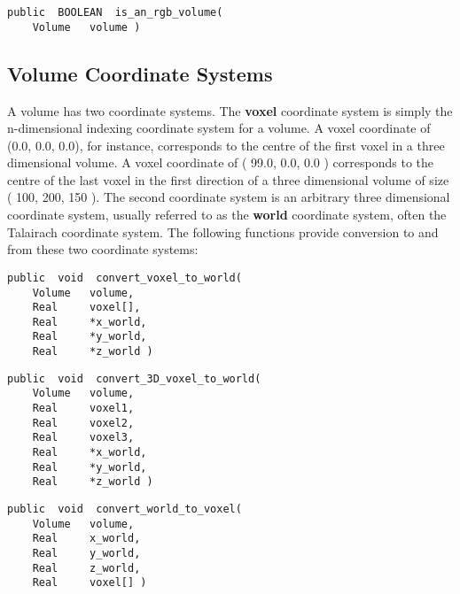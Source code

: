 
{\bf\begin{verbatim}
public  BOOLEAN  is_an_rgb_volume(
    Volume   volume )
\end{verbatim}}


\subsection{Volume Coordinate Systems}

A volume has two coordinate systems.  The {\bf voxel} coordinate
system is simply the n-dimensional indexing coordinate system for a
volume.  A voxel coordinate of (0.0, 0.0, 0.0), for instance, corresponds
to the centre of the first voxel in a three dimensional volume.  A voxel
coordinate of ( 99.0, 0.0, 0.0 ) corresponds to the centre of the last
voxel in the first direction of a three dimensional volume of size (
100, 200, 150 ).  The second coordinate system is an arbitrary
three dimensional coordinate system, usually referred to as the
{\bf world} coordinate system, often
the Talairach coordinate system.  The following functions provide
conversion to and from these two coordinate systems:

{\bf\begin{verbatim}
public  void  convert_voxel_to_world(
    Volume   volume,
    Real     voxel[],
    Real     *x_world,
    Real     *y_world,
    Real     *z_world )
\end{verbatim}}


{\bf\begin{verbatim}
public  void  convert_3D_voxel_to_world(
    Volume   volume,
    Real     voxel1,
    Real     voxel2,
    Real     voxel3,
    Real     *x_world,
    Real     *y_world,
    Real     *z_world )
\end{verbatim}}


{\bf\begin{verbatim}
public  void  convert_world_to_voxel(
    Volume   volume,
    Real     x_world,
    Real     y_world,
    Real     z_world,
    Real     voxel[] )
\end{verbatim}}

